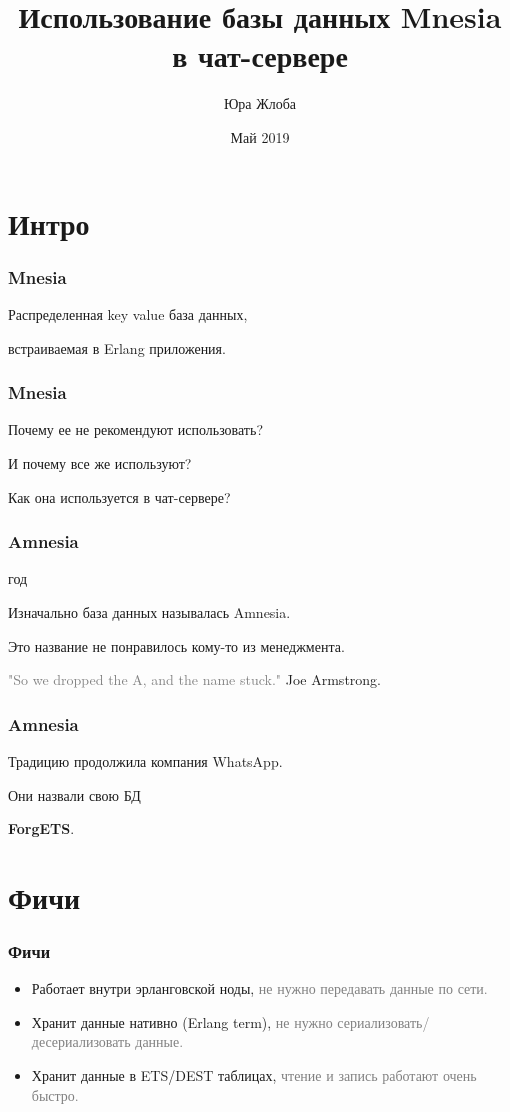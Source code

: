 \documentclass[10pt]{beamer}
\title{Использование базы данных Mnesia в чат-сервере}
\author{Юра Жлоба}
\institute{Wargaming.net}
\date{Май 2019}
\begin{document}
\maketitle

\section{Интро}

\begin{frame}
\frametitle{Mnesia}
\centering
Распределенная key value база данных,
\par \bigskip
встраиваемая в Erlang приложения.
\end{frame}

\begin{frame}
\frametitle{Mnesia}
\centering
Почему ее не рекомендуют использовать?
\par \bigskip
И почему все же используют?
\par \bigskip
Как она используется в чат-сервере?
\end{frame}

\begin{frame}
\frametitle{Amnesia}
 год
\par \bigskip
Изначально база данных называлась Amnesia.
\par \bigskip
Это название не понравилось кому-то из менеджмента.
\par \bigskip
\textcolor{gray}{"So we dropped the A, and the name stuck."} Joe Armstrong.
\end{frame}

\begin{frame}
\frametitle{Amnesia}
\centering
Традицию продолжила компания WhatsApp.
\par \bigskip
Они назвали свою БД
\par \bigskip
\textbf{ForgETS}.
\end{frame}

\section{Фичи}

\begin{frame}
\frametitle{Фичи}
\begin{itemize}[<+->]
\item Работает внутри эрланговской ноды,\newline
  \textcolor{gray}{не нужно передавать данные по сети.}
\item Хранит данные нативно (Erlang term),\newline
  \textcolor{gray}{не нужно сериализовать/десериализовать данные.}
\item Хранит данные в ETS/DEST таблицах,\newline
  \textcolor{gray}{чтение и запись работают очень быстро.}
\end{itemize}
\end{frame}
\end{document}
